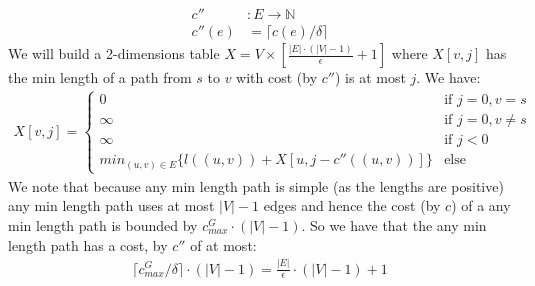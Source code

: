 \documentclass{article}
\begin{document}
\begin{enumerate}
\begin{align*}
c'' &: E \rightarrow \mathbb N\\
c''(e) &= \lceil c(e) / \delta \rceil
\end{align*} 
 We will build a 2-dimensions table $X=V\times [\frac{|E|\cdot (|V|-1)}{\epsilon} +1]$ where $X[v,j]$ has the min length of a path from $s$ to $v$ with cost (by $c''$) is at most $j$. We have:
\begin{align*}
X[v,j] = \begin{cases}
0  & \text{if } j=0,v=s \\
\infty  & \text{if } j=0,v\ne s \\
\infty  & \text{if } j<0 \\
min_{(u,v)\in E} \{ l((u,v)) + X[u,j-c''((u,v))]\}  & \text{else }
\end{cases} \quad 
\end{align*}
We note that because any min length path is simple (as the lengths are positive) any min length path uses at most $|V|-1$ edges and hence the cost (by $c$) of a any min length path is bounded by $c^G_{max}\cdot (|V|-1)$. So we have that the any min length path has a cost, by $c''$ of at most:
\begin{align*}
\lceil c^G_{max} / \delta \rceil \cdot (|V|-1)= \frac{|E|}{\epsilon} \cdot (|V|-1) +1
\end{align*}


\end{enumerate}
\end{document}
